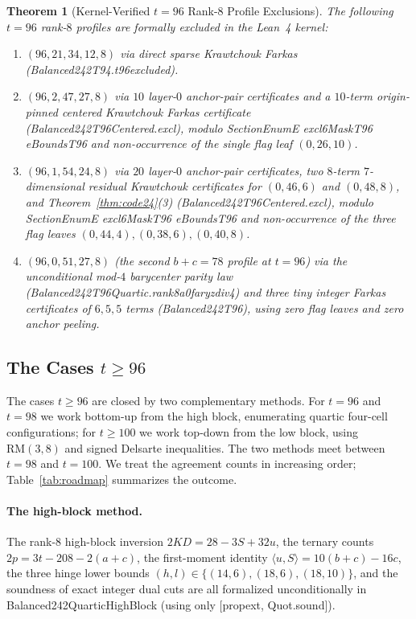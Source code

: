 \documentclass[11pt]{article}
\newtheorem{theorem}{Theorem}[section]
\theoremstyle{definition}
\newcommand{\code}[1]{{\ttfamily\small\renewcommand{\_}{\textunderscore\allowbreak}#1}}
\begin{document}
\begin{theorem}[Kernel-Verified $t = 96$ Rank-$8$ Profile Exclusions]
\label{thm:t96-profiles}
The following $t = 96$ rank-$8$ profiles are formally excluded in the Lean~4 kernel:
\begin{enumerate}[nosep]
  \item $(96, 21, 34, 12, 8)$ via direct sparse Krawtchouk Farkas (\code{Balanced242T94.t96\_21\_34\_12\_excluded}).
  \item $(96, 2, 47, 27, 8)$ via $10$ layer-$0$ anchor-pair certificates and a $10$-term origin-pinned centered Krawtchouk Farkas certificate (\code{Balanced242T96Centered.excl\_96\_2\_47\_27}), modulo \code{SectionEnumE excl6MaskT96 eBoundsT96} and non-occurrence of the single flag leaf $(0, 26, 10)$.
  \item $(96, 1, 54, 24, 8)$ via $20$ layer-$0$ anchor-pair certificates, two $8$-term $7$-dimensional residual Krawtchouk certificates for $(0, 46, 6)$ and $(0, 48, 8)$, and Theorem~\ref{thm:code24}(3) (\code{Balanced242T96Centered.excl\_96\_1\_54\_24}), modulo \code{SectionEnumE excl6MaskT96 eBoundsT96} and non-occurrence of the three flag leaves $(0,44,4), (0,38,6), (0,40,8)$.
  \item $(96, 0, 51, 27, 8)$ (the second $b + c = 78$ profile at $t = 96$) via the unconditional mod-$4$ barycenter parity law (\code{Balanced242T96Quartic.\allowbreak rank8\_a0\_far\_yz\_div4}) and three tiny integer Farkas certificates of $6, 5, 5$ terms (\code{Balanced242T96\_0\_51\_27}), using zero flag leaves and zero anchor peeling.
\end{enumerate}
\end{theorem}

\subsection{The Cases $t \ge 96$}
\label{sec:complete-closure}

The cases $t \ge 96$ are closed by two complementary methods.
For $t = 96$ and $t = 98$ we work bottom-up from the high block, enumerating quartic four-cell configurations; for $t \ge 100$ we work top-down from the low block, using $\mathrm{RM}(3,8)$ and signed Delsarte inequalities.
The two methods meet between $t = 98$ and $t = 100$.
We treat the agreement counts in increasing order; Table~\ref{tab:roadmap} summarizes the outcome.

\paragraph{The high-block method.}
The rank-$8$ high-block inversion $2KD = 28 - 3S + 32u$, the ternary counts $2p = 3t - 208 - 2(a+c)$, the first-moment identity $\langle u, S \rangle = 10(b+c) - 16c$, the three hinge lower bounds $(h,l) \in \{(14,6),(18,6),(18,10)\}$, and the soundness of exact integer dual cuts are all formalized unconditionally in \code{Balanced242QuarticHighBlock} (using only \code{[propext, Quot.sound]}).
\end{document}
